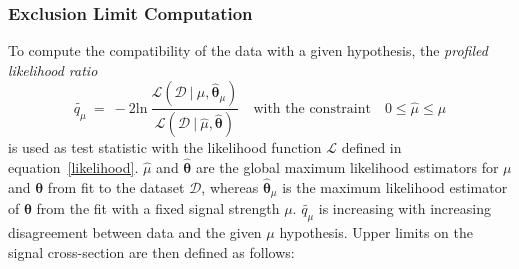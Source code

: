 \subsubsection{Exclusion Limit Computation}
To compute the compatibility of the data with a given hypothesis, the \emph{profiled likelihood ratio}~\cite{Asympt} 
\begin{equation}
\tilde{q_{\mu}} ~ = ~ -2 \text{ln} ~ \frac{\mathcal{L}(\mathcal{D}~|~\mu, \hat{\boldsymbol{\theta}}_{\mu})}{\mathcal{L}(\mathcal{D} ~| ~ 
\hat{\mu}, \hat{\boldsymbol{\theta}})}
\quad \text{with the constraint} \quad 0 \leq \hat{\mu} \leq \mu
\end{equation}
is used as test statistic with the likelihood function $\mathcal{L}$ defined in equation~\eqref{likelihood}. $\hat{\mu}$ and $\hat{\boldsymbol{\theta}}$ 
are the global maximum likelihood estimators for $\mu$ and $\boldsymbol{\theta}$ from fit to the dataset $\mathcal{D}$, 
whereas $\hat{\boldsymbol{\theta}}_{\mu}$ is the maximum likelihood estimator of $\boldsymbol{\theta}$ from the fit  with
a fixed signal strength $\mu$. $\tilde{q_{\mu}}$ is increasing with 
increasing disagreement between data and the given $\mu$ hypothesis.
Upper limits on the signal cross-section are then defined as follows:
